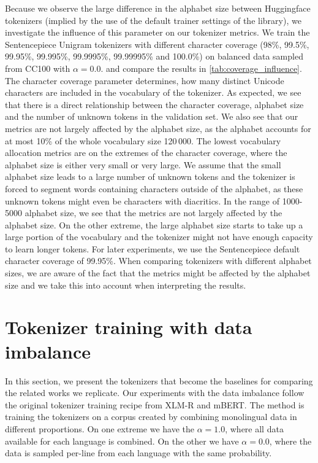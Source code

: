 

Because we observe the large difference in the alphabet size between Huggingface tokenizers (implied by the use of the default trainer settings of the library), we investigate the influence of this parameter on our tokenizer metrics. We train the Sentencepiece Unigram tokenizers with different character coverage (98\%, 99.5\%, 99.95\%, 99.995\%, 99.9995\%, 99.99995\% and 100.0\%) on balanced data sampled from CC100 with $\alpha=0.0$. and compare the results in \autoref{tab:coverage_influence}. The character coverage parameter determines, how many distinct Unicode characters are included in the vocabulary of the tokenizer. As expected, we see that there is a direct relationship between the character coverage, alphabet size and the number of unknown tokens in the validation set. We also see that our metrics are not largely affected by the alphabet size, as the alphabet accounts for at most 10\% of the whole vocabulary size 120\,000. The lowest vocabulary allocation metrics are on the extremes of the character coverage, where the alphabet size is either very small or very large. We assume that the small alphabet size leads to a large number of unknown tokens and the tokenizer is forced to segment words containing characters outside of the alphabet, as these unknown tokens might even be characters with diacritics. In the range of 1000-5000 alphabet size, we see that the metrics are not largely affected by the alphabet size. On the other extreme, the large alphabet size starts to take up a large portion of the vocabulary and the tokenizer might not have enough capacity to learn longer tokens. For later experiments, we use the Sentencepiece default character coverage of 99.95\%. When comparing tokenizers with different alphabet sizes, we are aware of the fact that the metrics might be affected by the alphabet size and we take this into account when interpreting the results.

\section{Tokenizer training with data imbalance}



In this section, we present the tokenizers that become the baselines for comparing the related works we replicate. Our experiments with the data imbalance follow the original tokenizer training recipe from XLM-R and mBERT. The method is training the tokenizers on a corpus created by combining monolingual data in different proportions. On one extreme we have the $\alpha=1.0$, where all data available for each language is combined. On the other we have $\alpha=0.0$, where the data is sampled per-line from each language with the same probability. 

